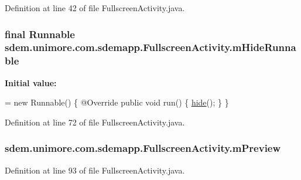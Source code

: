Definition at line 42 of file Fullscreen\+Activity.\+java.

\hypertarget{classsdem_1_1unimore_1_1com_1_1sdemapp_1_1_fullscreen_activity_ac827eae51a46edd22c566d19809e6bd1}{
\subsubsection[{m\+Hide\+Runnable}]{\setlength{\rightskip}{0pt plus 5cm}final Runnable sdem.\+unimore.\+com.\+sdemapp.\+Fullscreen\+Activity.\+m\+Hide\+Runnable\hspace{0.3cm}{\ttfamily [private]}}}\label{classsdem_1_1unimore_1_1com_1_1sdemapp_1_1_fullscreen_activity_ac827eae51a46edd22c566d19809e6bd1}
{\bfseries Initial value\+:}
\begin{DoxyCode}
= \textcolor{keyword}{new} Runnable() \{
        @Override
        \textcolor{keyword}{public} \textcolor{keywordtype}{void} run() \{
            \hyperlink{classsdem_1_1unimore_1_1com_1_1sdemapp_1_1_fullscreen_activity_a76e0f8b9e6b1bb7510336190cf6440ae}{hide}();
        \}
    \}
\end{DoxyCode}


Definition at line 72 of file Fullscreen\+Activity.\+java.

\hypertarget{classsdem_1_1unimore_1_1com_1_1sdemapp_1_1_fullscreen_activity_a84c4f3cc1fb84eba7a4cddbc27f4e11b}{
\subsubsection[{m\+Preview}]{ sdem.\+unimore.\+com.\+sdemapp.\+Fullscreen\+Activity.\+m\+Preview\hspace{0.3cm}{\ttfamily [private]}}}\label{classsdem_1_1unimore_1_1com_1_1sdemapp_1_1_fullscreen_activity_a84c4f3cc1fb84eba7a4cddbc27f4e11b}


Definition at line 93 of file Fullscreen\+Activity.\+java.

